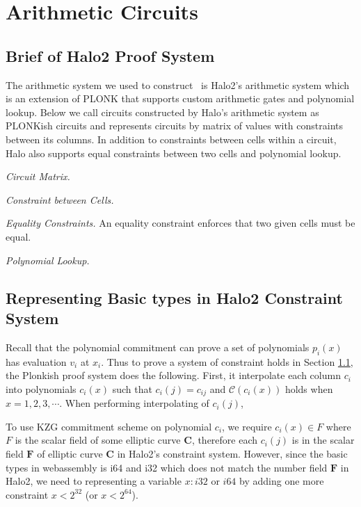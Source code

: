 \section{Arithmetic Circuits}
\subsection{Brief of Halo2 Proof System}
\label{chp:constraint-system}
The arithmetic system we used to construct \zkwasm\, is Halo2's arithmetic system which is an extension of PLONK that supports custom arithmetic gates and polynomial lookup. Below we call circuits constructed by Halo's arithmetic system as PLONKish circuits and represents circuits by matrix of values with constraints between its columns. In addition to constraints between cells within a circuit, Halo also supports equal constraints between two cells and polynomial lookup.

\smallskip\noindent\emph{Circuit Matrix.}

\smallskip\noindent\emph{Constraint between Cells.}

\smallskip\noindent\emph{Equality Constraints.} An equality constraint enforces that two given cells must be equal.

\smallskip\noindent\emph{Polynomial Lookup.}


\subsection{Representing Basic types in Halo2 Constraint System}
Recall that the polynomial commitment can prove a set of polynomials $p_i(x)$ has evaluation $v_i$ at $x_i$. Thus to prove a system of constraint holds in Section \ref{chp:constraint-system}, the Plonkish proof system does the following. First, it interpolate each column $c_i$ into polynomials $c_i(x)$ such that $c_i(j) = c_{ij}$ and $\mathcal{C}(c_i(x))$ holds when $x=1,2,3,\cdots$. When performing interpolating of $c_i(j)$, 

To use KZG commitment scheme on polynomial $c_i$, we require $c_i(x) \in F$ where $F$ is the scalar field of some elliptic curve $\mathbf{C}$, therefore each $c_i(j)$ is in the scalar field $\mathbf{F}$ of elliptic curve $\mathbf{C}$ in Halo2's constraint system. However, since the basic types in webassembly is i64 and i32 which does not match the number field $\mathbf{F}$ in Halo2, we need to representing a variable $x:i32$ or $i64$ by adding one more constraint $x<2^{32}$ (or $x< 2^{64}$).

